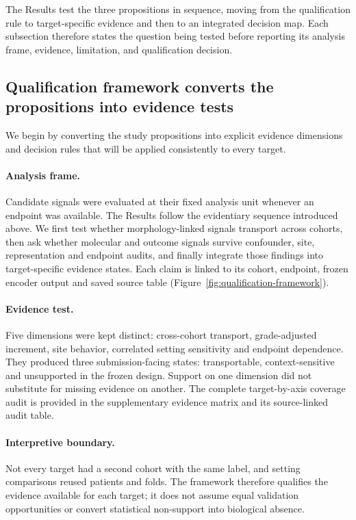 The Results test the three propositions in sequence, moving from the qualification rule to
target-specific evidence and then to an integrated decision map. Each subsection therefore
states the question being tested before reporting its analysis frame, evidence, limitation,
and qualification decision.

\subsection{Qualification framework converts the propositions into evidence tests}

We begin by converting the study propositions into explicit evidence dimensions and decision
rules that will be applied consistently to every target.

\paragraph{Analysis frame.}
Candidate signals were evaluated at their fixed analysis unit whenever an endpoint was
available.
The Results follow the evidentiary sequence introduced above. We first test whether
morphology-linked signals transport across cohorts, then ask whether molecular and outcome
signals survive confounder, site, representation and endpoint audits, and finally integrate
those findings into target-specific evidence states. Each claim is linked to its cohort,
endpoint, frozen encoder output and saved source table (Figure~\ref{fig:qualification-framework}).

\paragraph{Evidence test.}
Five dimensions were kept distinct: cross-cohort transport, grade-adjusted increment, site
behavior, correlated setting sensitivity and endpoint dependence. They produced three
submission-facing states: transportable, context-sensitive and unsupported in the frozen
design. Support on one dimension did not substitute for missing evidence on another. The
complete target-by-axis coverage audit is provided in the supplementary evidence matrix and
its source-linked audit table.

\paragraph{Interpretive boundary.}
Not every target had a second cohort with the same label, and setting comparisons reused
patients and folds. The framework therefore qualifies the evidence available for each
target; it does not assume equal validation opportunities or convert statistical
non-support into biological absence.

